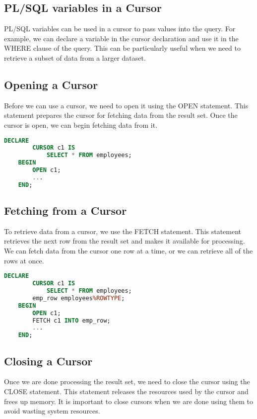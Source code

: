 \documentclass[11pt]{article}
\begin{document}
\subsection{PL/SQL variables in a Cursor}

PL/SQL variables can be used in a cursor to pass values into the query. For example, we can declare a variable in the cursor declaration and use it in the WHERE clause of the query. This can be particularly useful when we need to retrieve a subset of data from a larger dataset.


\subsection{Opening a Cursor}

Before we can use a cursor, we need to open it using the OPEN statement. This statement prepares the cursor for fetching data from the result set. Once the cursor is open, we can begin fetching data from it.

\begin{lstlisting}[language=sql]
    DECLARE
        CURSOR c1 IS
            SELECT * FROM employees;
    BEGIN
        OPEN c1;
        ...
    END;
\end{lstlisting}

\subsection{Fetching from a Cursor}

To retrieve data from a cursor, we use the FETCH statement. This statement retrieves the next row from the result set and makes it available for processing. We can fetch data from the cursor one row at a time, or we can retrieve all of the rows at once.

\begin{lstlisting}[language=sql]
    DECLARE
        CURSOR c1 IS
            SELECT * FROM employees;
        emp_row employees%ROWTYPE;
    BEGIN
        OPEN c1;
        FETCH c1 INTO emp_row;
        ...
    END;
\end{lstlisting}

\subsection{Closing a Cursor}

Once we are done processing the result set, we need to close the cursor using the CLOSE statement. This statement releases the resources used by the cursor and frees up memory. It is important to close cursors when we are done using them to avoid wasting system resources.
\end{document}

